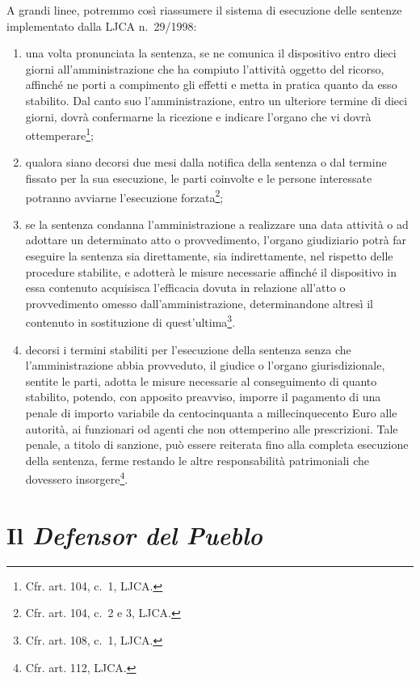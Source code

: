 \documentclass[12pt,it,a4paper,]{report}
\begin{document}
A grandi linee, potremmo così riassumere il sistema di esecuzione delle
sentenze implementato dalla LJCA n.~29/1998:

\begin{enumerate}
\def\labelenumi{\alph{enumi})}
\item
  una volta pronunciata la sentenza, se ne comunica il dispositivo entro
  dieci giorni all'amministrazione che ha compiuto l'attività oggetto
  del ricorso, affinché ne porti a compimento gli effetti e metta in
  pratica quanto da esso stabilito. Dal canto suo l'amministrazione,
  entro un ulteriore termine di dieci giorni, dovrà confermarne la
  ricezione e indicare l'organo che vi dovrà ottemperare\footnote{Cfr.
    art. 104, c.~1, LJCA.};
\item
  qualora siano decorsi due mesi dalla notifica della sentenza o dal
  termine fissato per la sua esecuzione, le parti coinvolte e le persone
  interessate potranno avviarne l'esecuzione forzata\footnote{Cfr. art.
    104, c.~2 e 3, LJCA.};
\item
  se la sentenza condanna l'amministrazione a realizzare una data
  attività o ad adottare un determinato atto o provvedimento, l'organo
  giudiziario potrà far eseguire la sentenza sia direttamente, sia
  indirettamente, nel rispetto delle procedure stabilite, e adotterà le
  misure necessarie affinché il dispositivo in essa contenuto acquisisca
  l'efficacia dovuta in relazione all'atto o provvedimento omesso
  dall'amministrazione, determinandone altresì il contenuto in
  sostituzione di quest'ultima\footnote{Cfr. art. 108, c.~1, LJCA.}.
\item
  decorsi i termini stabiliti per l'esecuzione della sentenza senza che
  l'amministrazione abbia provveduto, il giudice o l'organo
  giurisdizionale, sentite le parti, adotta le misure necessarie al
  conseguimento di quanto stabilito, potendo, con apposito preavviso,
  imporre il pagamento di una penale di importo variabile da
  centocinquanta a millecinquecento Euro alle autorità, ai funzionari od
  agenti che non ottemperino alle prescrizioni. Tale penale, a titolo di
  sanzione, può essere reiterata fino alla completa esecuzione della
  sentenza, ferme restando le altre responsabilità patrimoniali che
  dovessero insorgere\footnote{Cfr. art. 112, LJCA.}.
\end{enumerate}

\hypertarget{il-defensor-del-pueblo}{%
\section{\texorpdfstring{Il \emph{Defensor del
Pueblo}}{Il Defensor del Pueblo}}\label{il-defensor-del-pueblo}}
\end{document}
